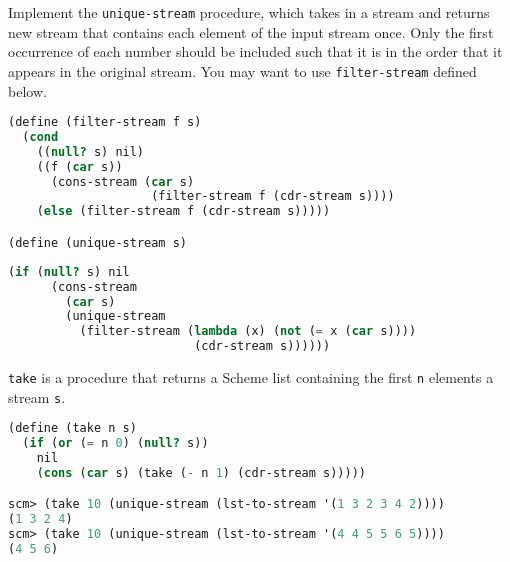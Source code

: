 \question Implement the \texttt{unique-stream} procedure, which takes in a
stream and returns new stream that contains each element of the input stream
once. Only the first occurrence of each number should be included such that it is
in the order that it appears in the original stream. You may want to use
\texttt{filter-stream} defined below.

\begin{lstlisting}[language=Scheme]
(define (filter-stream f s)
  (cond
    ((null? s) nil)
    ((f (car s))
      (cons-stream (car s)
                    (filter-stream f (cdr-stream s))))
    (else (filter-stream f (cdr-stream s)))))

(define (unique-stream s)
\end{lstlisting}
\begin{solution}[2.5in]
\begin{lstlisting}[language=Scheme]
  (if (null? s) nil
      (cons-stream
        (car s)
        (unique-stream
          (filter-stream (lambda (x) (not (= x (car s))))
                          (cdr-stream s))))))
\end{lstlisting}
\end{solution}

\texttt{take} is a procedure that returns a Scheme list containing the first \texttt{n} elements a stream \texttt{s}.
\begin{lstlisting}[language=Scheme]
(define (take n s)
  (if (or (= n 0) (null? s))
    nil
    (cons (car s) (take (- n 1) (cdr-stream s)))))

scm> (take 10 (unique-stream (lst-to-stream '(1 3 2 3 4 2))))
(1 3 2 4)
scm> (take 10 (unique-stream (lst-to-stream '(4 4 5 5 6 5))))
(4 5 6)
\end{lstlisting}

